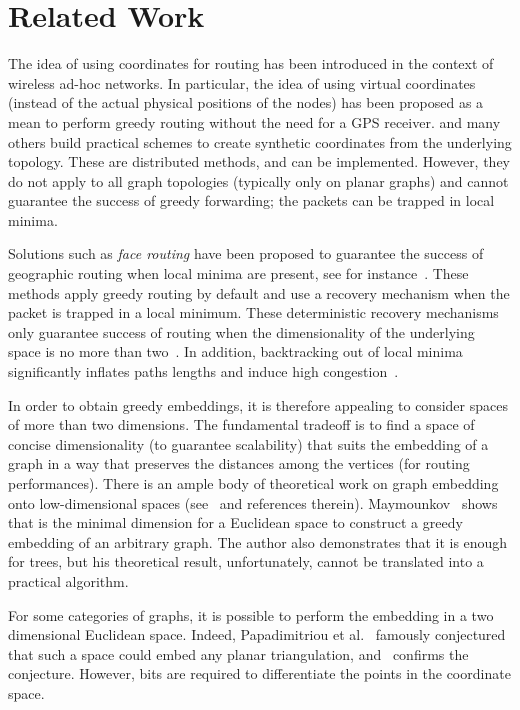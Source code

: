 \documentclass[conference]{IEEEtran}
\begin{document}
\section{Related Work}
\label{sec:rw}
The idea of using coordinates for routing has been introduced in the context of wireless ad-hoc networks. In particular, the idea of using virtual coordinates (instead of the actual physical positions of the nodes) has been proposed as a mean to perform greedy routing without the need for a GPS receiver. \cite{rao:geographic, Dabek:vivaldi} and many others build practical schemes to create synthetic coordinates from the underlying topology. These are distributed methods, and can be implemented. However, they do not apply to all graph topologies (typically only on planar graphs) and cannot guarantee the success of greedy forwarding; the packets can be trapped in local minima.




Solutions such as \emph{face routing} have been proposed to guarantee the success of geographic routing when local minima are present, see for instance~\cite{goafr}.
These methods apply greedy routing by default and use a recovery mechanism when the packet is trapped in a local minimum. These deterministic recovery mechanisms only guarantee success of routing when the dimensionality of the underlying space is no more than two~\cite{durocher:3d}. In addition, backtracking out of local minima significantly inflates paths lengths and induce high congestion~\cite{subramanian:optimal}.



In order to obtain greedy embeddings, it is therefore appealing to consider spaces of more than two dimensions. The fundamental tradeoff is to find a space of concise dimensionality (to guarantee scalability) that suits the embedding of a graph in a way that preserves the distances among the vertices (for routing performances). There is an ample body of theoretical work on graph embedding onto low-dimensional spaces (see~\cite{matousek} and references therein). Maymounkov~\cite{maymounkov:greedy} shows that  is the minimal dimension for a Euclidean space to construct a greedy embedding of an arbitrary graph. The author also demonstrates that it is enough for trees, but his theoretical result, unfortunately, cannot be translated into a practical algorithm.

For some categories of graphs, it is possible to perform the embedding in a two dimensional Euclidean space. Indeed, Papadimitriou et al.~\cite{papadimitriou:conjecture} famously conjectured that such a space could embed any planar triangulation, and~\cite{moitra:greedy} confirms the conjecture. However,  bits are required to differentiate the points in the coordinate space.
\end{document}
